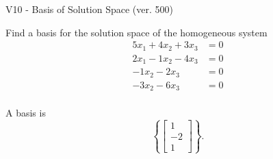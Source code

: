 \begin{exercise}
  \begin{exerciseTitle}V10 - Basis of Solution Space (ver. 500)\end{exerciseTitle}
  \begin{exerciseStatement}
    Find a basis for the solution space of the homogeneous system 
\begin{align*}
 5 x_ 1 + 4 x_ 2 + 3 x_ 3 &= 0  \\ 
  2 x_ 1 -1 x_ 2 -4 x_ 3 &= 0  \\ 
  -1 x_ 2 -2 x_ 3 &= 0  \\ 
  -3 x_ 2 -6 x_ 3 &= 0  \\ 
 \end{align*}


 
  \end{exerciseStatement}

  \begin{exerciseAnswer}
   A basis is   
\[\left\{\left[\begin{array}{c}
1 \\
-2 \\
1
\end{array}\right]\right\}.\]

  


  \end{exerciseAnswer}
\end{exercise}